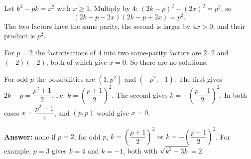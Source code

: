 Let $k^2-pk=x^2$ with $x\ge1$. Multiply by $4$: $(2k-p)^2-(2x)^2=p^2$, so
\[(2k-p-2x)(2k-p+2x)=p^2.\]
The two factors have the same parity, the second is larger by $4x>0$, and their product is $p^2$.

For $p=2$ the factorisations of $4$ into two same-parity factors are $2\cdot2$ and $(-2)(-2)$, both of which give $x=0$. So there are no solutions.

For odd $p$ the possibilities are $(1,p^2)$ and $(-p^2,-1)$. The first gives $2k-p=\dfrac{p^2+1}2$, i.e. $k=\left(\dfrac{p+1}2\right)^2$. The second gives $k=-\left(\dfrac{p-1}2\right)^2$. In both cases $x=\dfrac{p^2-1}4$, and $(p,p)$ would give $x=0$.

\textbf{Answer:} none if $p=2$; for odd $p$, $\boxed{k=\left(\dfrac{p+1}2\right)^2\text{ or }k=-\left(\dfrac{p-1}2\right)^2}$. For example, $p=3$ gives $k=4$ and $k=-1$, both with $\sqrt{k^2-3k}=2$.
